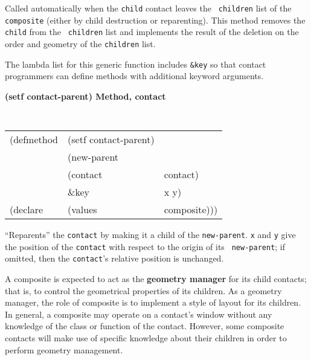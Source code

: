 \documentclass[twoside]{book}
\begin{document}
\begin{sloppy}
\begin{flushright}
{}\end{flushright}

\begin{flushright} \parbox[t]{6.125in}{
Called automatically when the {\tt child} contact leaves the {\tt
children} list of the {\tt composite} (either by child destruction or
reparenting). This method  removes the {\tt child} from the {\tt
children} list and implements the result of the deletion on the order and
geometry of the {\tt children} list.

The lambda list for this generic function includes {\tt \&key} so that contact
programmers can define methods with additional keyword arguments.
}\end{flushright}

{\samepage
{\large {\bf (setf contact-parent) \hfill Method, contact}}
\begin{flushright} \parbox[t]{6.125in}{
\tt
\begin{tabular}{lll}
\raggedright
(defmethod & (setf contact-parent) & \\
& (new-parent\\
&  (contact  &contact)\\
&  \&key & x y) \\
(declare &(values & composite)))
\end{tabular}
\rm

}\end{flushright}}

\begin{flushright} \parbox[t]{6.125in}{
``Reparents'' the {\tt contact} by making it
a child of the {\tt new-parent}. {\tt x} and {\tt y} give 
the position of the {\tt contact} with respect to the origin of its {\tt
new-parent}; if omitted, then the {\tt contact}'s relative position is
unchanged. 

}\end{flushright}



A composite is expected to act as the {\bf geometry manager}
for its child contacts; that is, to control
the geometrical properties of its children. As a geometry manager, the role of composite
is to
implement a style of layout for its children. In general, a
composite may operate on a contact's window without any knowledge of the class
or function of the contact. However, some composite contacts will make use of
specific knowledge about their children in order to perform geometry management.


\end{sloppy}
\end{document}
